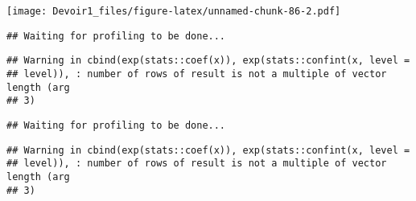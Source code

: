 \documentclass[]{article}
\newenvironment{Shaded}{\begin{snugshade}}{\end{snugshade}}
\newcommand{\KeywordTok}[1]{\textcolor[rgb]{0.13,0.29,0.53}{\textbf{#1}}}
\newcommand{\DataTypeTok}[1]{\textcolor[rgb]{0.13,0.29,0.53}{#1}}
\newcommand{\DecValTok}[1]{\textcolor[rgb]{0.00,0.00,0.81}{#1}}
\newcommand{\StringTok}[1]{\textcolor[rgb]{0.31,0.60,0.02}{#1}}
\newcommand{\OperatorTok}[1]{\textcolor[rgb]{0.81,0.36,0.00}{\textbf{#1}}}
\newcommand{\NormalTok}[1]{#1}
\begin{document}
\texttt{[image: Devoir1\_files/figure-latex/unnamed-chunk-86-2.pdf]}

\begin{Shaded}
\end{Shaded}

\begin{verbatim}
## Waiting for profiling to be done...
\end{verbatim}

\begin{verbatim}
## Warning in cbind(exp(stats::coef(x)), exp(stats::confint(x, level =
## level)), : number of rows of result is not a multiple of vector length (arg
## 3)
\end{verbatim}

\begin{verbatim}
## Waiting for profiling to be done...
\end{verbatim}

\begin{verbatim}
## Warning in cbind(exp(stats::coef(x)), exp(stats::confint(x, level =
## level)), : number of rows of result is not a multiple of vector length (arg
## 3)
\end{verbatim}
\end{document}
